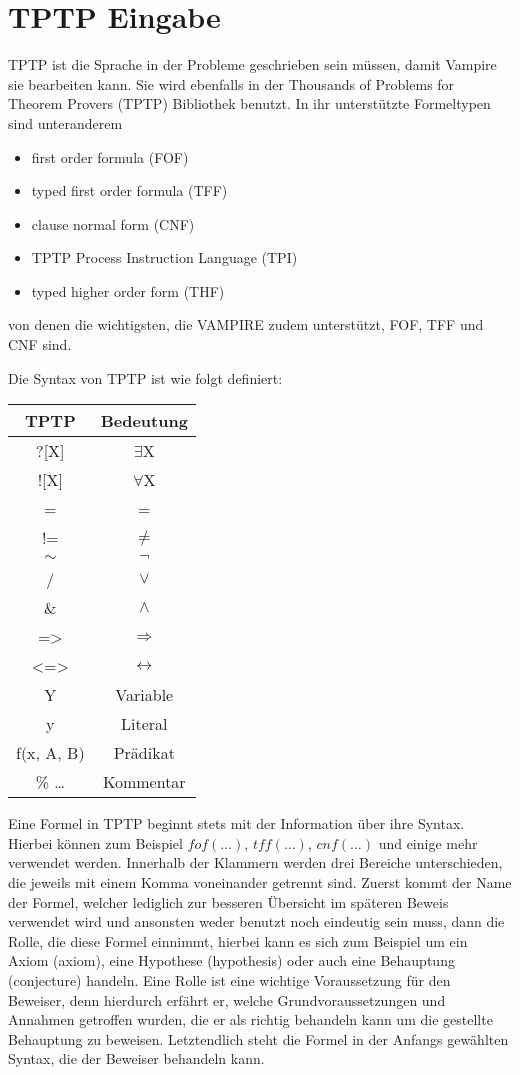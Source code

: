 \documentclass{acm_proc_article-sp-german}
\begin{document}
\section{TPTP Eingabe}
\label{sec:input}

TPTP ist die Sprache in der Probleme geschrieben sein müssen, damit Vampire sie bearbeiten kann. Sie wird ebenfalls in der Thousands of Problems for Theorem Provers (TPTP) Bibliothek benutzt.
In ihr unterstützte Formeltypen sind unteranderem 
\begin{itemize}
	\item first order formula (FOF)
	\item typed first order formula (TFF)
	\item clause normal form (CNF)
	\item TPTP Process Instruction Language  (TPI)
	\item typed higher order form (THF)
\end{itemize}
von denen die wichtigsten, die VAMPIRE zudem unterstützt, FOF, TFF und CNF sind.

Die Syntax von TPTP ist wie folgt definiert:

\begin{tabular}{|c|c|}
	\hline TPTP & Bedeutung \\ 
	\hline ?[X] & $\exists$X \\
	\hline ![X] & $\forall$X \\
	\hline = & = \\
	\hline != & $\neq$ \\
	\hline $\sim$ & $\lnot$ \\
	\hline / & $\lor$ \\
	\hline \& & $\land$ \\
	\hline => & $\Rightarrow$ \\
	\hline <=> & $\leftrightarrow$ \\
	\hline Y & Variable \\
	\hline y & Literal \\
	\hline f(x, A, B) & Prädikat \\
	\hline \% \dots & Kommentar \\
	\hline
\end{tabular} 


Eine Formel in TPTP beginnt stets mit der Information über ihre Syntax. Hierbei können zum Beispiel $fof(\dots)$, $tff(\dots)$, $cnf(\dots)$ und einige mehr verwendet werden.
Innerhalb der Klammern werden drei Bereiche unterschieden, die jeweils mit einem Komma voneinander getrennt sind. 
Zuerst kommt der Name der Formel, welcher lediglich zur besseren Übersicht im späteren Beweis verwendet wird und ansonsten weder benutzt noch eindeutig sein muss,
dann die Rolle, die diese Formel einnimmt, hierbei kann es sich zum Beispiel um ein Axiom (axiom), eine Hypothese (hypothesis) oder auch eine Behauptung (conjecture) handeln.
Eine Rolle ist eine wichtige Voraussetzung für den Beweiser, denn hierdurch erfährt er, welche Grundvoraussetzungen und Annahmen getroffen wurden, die er als richtig behandeln kann um die gestellte Behauptung zu beweisen.
Letztendlich steht die Formel in der Anfangs gewählten Syntax, die der Beweiser behandeln kann.
\end{document}
